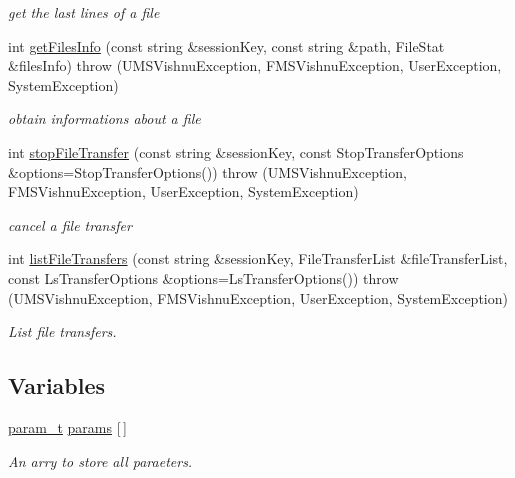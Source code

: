 \begin{DoxyCompactItemize}
\begin{DoxyCompactList}\small\item\em get the last lines of a file \item\end{DoxyCompactList}\item 
int \hyperlink{namespacevishnu_a80b9f9b9ae713916ad8965e36458113d}{getFilesInfo} (const string \&sessionKey, const string \&path, FileStat \&filesInfo)  throw (UMSVishnuException, FMSVishnuException, UserException, SystemException)
\begin{DoxyCompactList}\small\item\em obtain informations about a file \item\end{DoxyCompactList}\item 
int \hyperlink{namespacevishnu_ac7f9c1d4391157b7dddaab5051fd44a8}{stopFileTransfer} (const string \&sessionKey, const StopTransferOptions \&options=StopTransferOptions())  throw (UMSVishnuException, FMSVishnuException, UserException, SystemException)
\begin{DoxyCompactList}\small\item\em cancel a file transfer \item\end{DoxyCompactList}\item 
int \hyperlink{namespacevishnu_a5159cd0b198000c690a1e9f88abb1329}{listFileTransfers} (const string \&sessionKey, FileTransferList \&fileTransferList, const LsTransferOptions \&options=LsTransferOptions())  throw (UMSVishnuException, FMSVishnuException, UserException, SystemException)
\begin{DoxyCompactList}\small\item\em List file transfers. \item\end{DoxyCompactList}\end{DoxyCompactItemize}
\subsection*{Variables}
\begin{DoxyCompactItemize}
\item 
\hypertarget{namespacevishnu_a1ca7d1d1baf7cebd2530d93b9f064bd9}{
\hyperlink{structvishnu_1_1param__t}{param\_\-t} \hyperlink{namespacevishnu_a1ca7d1d1baf7cebd2530d93b9f064bd9}{params} \mbox{[}$\,$\mbox{]}}
\label{namespacevishnu_a1ca7d1d1baf7cebd2530d93b9f064bd9}

\begin{DoxyCompactList}\small\item\em An arry to store all paraeters. \item\end{DoxyCompactList}\end{DoxyCompactItemize}


